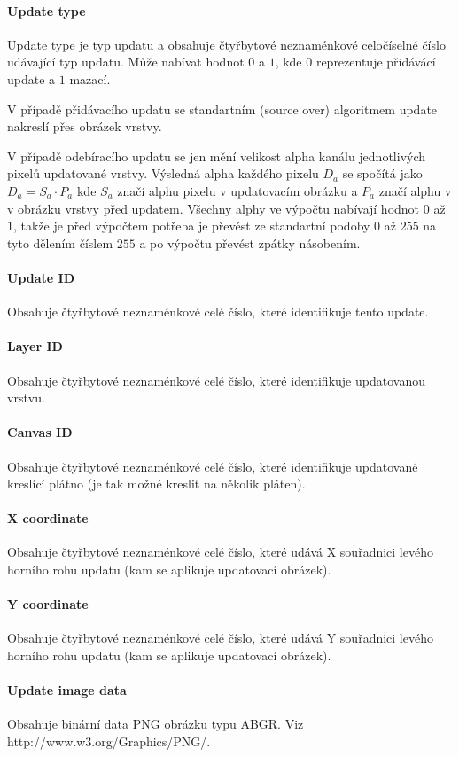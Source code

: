 \documentclass[12pt,oneside,a4paper]{report}
\begin{document}
\paragraph{Update type}
Update type je typ updatu a obsahuje čtyřbytové neznaménkové celočíselné číslo udávající typ updatu. Může nabívat hodnot $0$ a $1$, kde $0$ reprezentuje přidávácí update a $1$ mazací.

V případě přidávacího updatu se standartním (source over) algoritmem update nakreslí přes obrázek vrstvy. 

V případě odebíracího updatu se jen mění velikost alpha kanálu jednotlivých pixelů updatované vrstvy. Výsledná alpha každého pixelu $D_{a}$ se spočítá jako $D_{a} = S_{a} \cdot P_{a}$ kde $S_{a}$ značí alphu pixelu v updatovacím obrázku a $P_{a}$ značí alphu v v obrázku vrstvy před updatem. Všechny alphy ve výpočtu nabívají hodnot $0$ až $1$, takže je před výpočtem potřeba je převést ze standartní podoby $0$ až $255$ na tyto dělením číslem $255$ a po výpočtu převést zpátky násobením.

\paragraph{Update ID}
Obsahuje čtyřbytové neznaménkové celé číslo, které identifikuje tento update.

\paragraph{Layer ID}
Obsahuje čtyřbytové neznaménkové celé číslo, které identifikuje updatovanou vrstvu.

\paragraph{Canvas ID}
Obsahuje čtyřbytové neznaménkové celé číslo, které identifikuje updatované kreslící plátno (je tak možné kreslit na několik pláten).

\paragraph{X coordinate}
Obsahuje čtyřbytové neznaménkové celé číslo, které udává X souřadnici levého horního rohu updatu (kam se aplikuje updatovací obrázek).

\paragraph{Y coordinate}
Obsahuje čtyřbytové neznaménkové celé číslo, které udává Y souřadnici levého horního rohu updatu (kam se aplikuje updatovací obrázek).

\paragraph{Update image data}
Obsahuje binární data PNG obrázku typu ABGR. Viz http://www.w3.org/Graphics/PNG/. 
\end{document}
